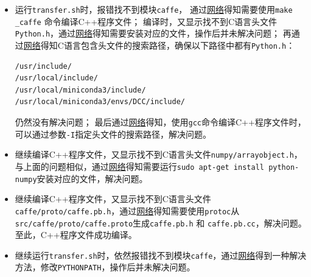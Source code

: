 \documentclass[12pt]{article}
\begin{document}
\begin{itemize}
\item 运行\verb|transfer.sh|时，报错找不到模块\verb|caffe|，
通过\href{https://blog.csdn.net/jiyangsb/article/details/77724876}{网络}得知需要使用\verb|make _caffe| 命令编译C++程序文件；
编译时，又显示找不到C语言头文件\verb|Python.h|，通过\href{https://blog.csdn.net/slz0813/article/details/82961906#:~:text=%3Cbr%20%2F%3E%3Cbr%20%2F%3E%E5%87%BA%E7%8E%B0%20No%20such%20file%20or%20directory,%E7%9A%84%E9%94%99%E8%AF%AF%EF%BC%8C%E6%9C%89%E4%B8%A4%E7%A7%8D%E6%83%85%E5%86%B5%EF%BC%8C%E4%B8%80%E7%A7%8D%E6%98%AF%E7%9C%9F%E7%9A%84%E6%B2%A1%E6%9C%89%20Python.h%E8%BF%99%E4%B8%AA%E6%96%87%E4%BB%B6%EF%BC%8C%E4%B8%80%E7%A7%8D%E6%98%AF%20Python%20%E7%9A%84%E7%89%88%E6%9C%AC%E4%B8%8D%E5%AF%B9%EF%BC%8C%3Cbr%20%2F%3E%E5%8F%AF%E4%BB%A5%E8%BF%9B%E5%85%A5%2Fusr%2Finclude%2F%E6%96%87%E4%BB%B6%E5%A4%B9%E4%B8%8B%E7%9A%84%20Python%202.x%E6%96%87%E4%BB%B6%E5%A4%B9%E9%87%8C%E6%9F%A5%E6%89%BE%E6%98%AF%E5%90%A6%E6%9C%89%20Python.h%E8%BF%99%E4%B8%AA%E6%96%87%E4%BB%B6%E3%80%82}{网络}得知需要安装对应的文件，操作后并未解决问题；
再通过\href{https://blog.csdn.net/Hello_Orange/article/details/6184420}{网络}得知C语言包含头文件的搜索路径，确保以下路径中都有\verb|Python.h|：
\begin{lstlisting}
/usr/include/
/usr/local/include/
/usr/local/miniconda3/include/
/usr/local/miniconda3/envs/DCC/include/
\end{lstlisting}
仍然没有解决问题；
最后通过\href{https://www.cnblogs.com/xiel/p/3613919.html}{网络}得知，使用\verb|gcc|命令编译C++程序文件时，可以通过参数\verb|-I|指定头文件的搜索路径，解决问题。
\item 继续编译C++程序文件，又显示找不到C语言头文件\verb|numpy/arrayobject.h|，与上面的问题相似，通过\href{https://blog.csdn.net/wuzuyu365/article/details/52430657}{网络}得知需要运行\verb|sudo apt-get install python-numpy|安装对应的文件，解决问题。
\item 继续编译C++程序文件，又显示找不到C语言头文件\verb|caffe/proto/caffe.pb.h|，通过\href{https://blog.csdn.net/ycz28/article/details/78920140}{网络}得知需要使用\verb|protoc|从\verb|src/caffe/proto/caffe.proto|生成\verb|caffe.pb.h| 和 \verb|caffe.pb.cc|，解决问题。
至此，C++程序文件成功编译。
\item 继续运行\verb|transfer.sh|时，依然报错找不到模块\verb|caffe|，通过\href{https://blog.csdn.net/silverdemon/article/details/77752873}{网络}得到一种解决方法，修改\verb|PYTHONPATH|，操作后并未解决问题。

\end{itemize}
\end{document}
